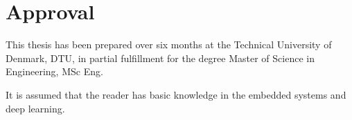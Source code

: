 \section*{Approval}
This thesis has been prepared over six months at the Technical University of Denmark, DTU, in partial fulfillment for the degree Master of Science in Engineering, MSc Eng. 

It is assumed that the reader has basic knowledge in the embedded systems and deep learning. 

\vfill

\begin{center}
\namesigdate{\thesisauthor~-~\studentnumber}
\end{center}

\vfill

